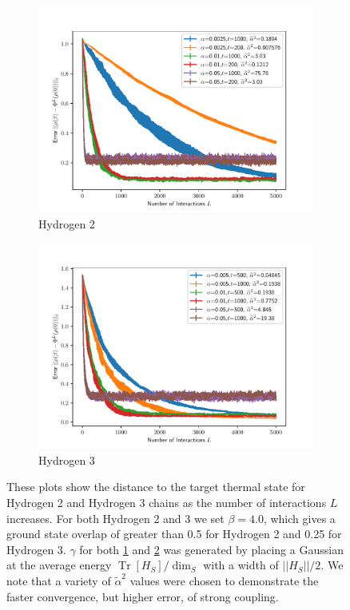 \documentclass[
 amsmath,amssymb,
 aps,
onecolumn, 
nofootinbib]{revtex4-2}
\newcommand{\brackets}[1]{\left[ #1 \right]}
\newcommand{\norm}[1]{\left|\left| #1 \right|\right|}
\DeclareMathOperator{\Tr}{Tr}
\newcommand{\trace}[1]{\Tr \brackets{ #1 }}
\begin{document}
\begin{figure}
\centering
    \centering
    \begin{subfigure}{0.49\textwidth}
        \includegraphics[width = \textwidth]{numerics/data/error_vs_interaction_h2_chain_1.pdf}    
        \caption{Hydrogen 2 }\label{fig:h2_error}
    \end{subfigure}    
    \begin{subfigure}{0.49\textwidth}
        \includegraphics[width=\textwidth]{numerics/data/error_vs_interaction_h3_chain_3.pdf}
        \caption{Hydrogen 3 }\label{fig:h3_error}
    \end{subfigure} 
    \caption{These plots show the distance to the target thermal state for Hydrogen 2 and Hydrogen 3 chains as the number of interactions $L$ increases. For both Hydrogen 2 and 3 we set $\beta = 4.0$, which gives a ground state overlap of greater than 0.5 for Hydrogen 2 and 0.25 for Hydrogen 3. $\gamma$ for both \ref{fig:h2_error} and \ref{fig:h3_error} was generated by placing a Gaussian at the average energy $\trace{H_S} / \dim_S$ with a width of $\norm{H_S} / 2$. We note that a variety of $\widetilde{\alpha}^2$ values were chosen to demonstrate the faster convergence, but higher error, of strong coupling.
    }
    \label{fig:h_chain_error}
\end{figure}
\end{document}

